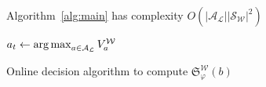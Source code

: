 \begin{proposition}
Algorithm~\ref{alg:main} has complexity 
$O(|\mathcal{A}_\mathcal{L}||\mathcal{S}_\mathcal{W}|^2)$
\end{proposition}

\begin{algorithm}
	$a_t \leftarrow \operatorname*{arg\,max}_{a \in \mathcal{A}_\mathcal{L}}V_{a}^\mathcal{W}$\;
 \caption{Online decision algorithm to compute $\mathfrak{S}_\varphi^\mathcal{W}(b)$}\label{alg:main}
\end{algorithm}

